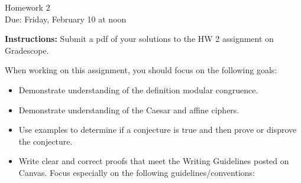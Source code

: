\documentclass[12pt]{article}
\begin{document}
\begin{center}
{\Large Homework 2}\\
Due: Friday,  February 10 at noon\\


\end{center}
{\bf Instructions:} Submit a pdf of your solutions to the HW 2 assignment on Gradescope. 

When working on this assignment, you should focus on the following goals:
\begin{itemize}
\item Demonstrate understanding of the definition modular congruence.
\item Demonstrate understanding of the Caesar and affine ciphers.
\item Use examples to determine if a conjecture is true and then prove or disprove the conjecture. 
\item Write clear and correct proofs that meet the Writing Guidelines posted on Canvas. Focus especially on the following guidelines/conventions:
\end{itemize}
\end{document}
